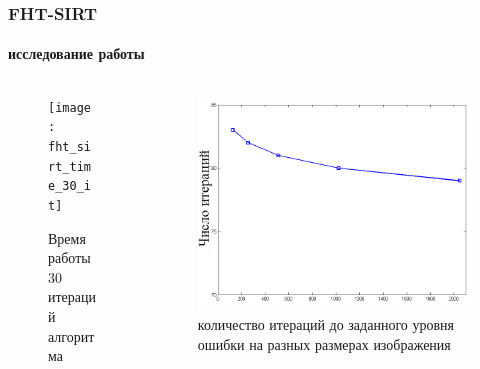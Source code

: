 \begin{frame}
\frametitle{FHT-SIRT}
\framesubtitle{исследование работы}

\begin{columns}[T,onlytextwidth]
  \hspace*{-0.5cm}
  \begin{column}{0.53\textwidth}
    \begin{figure}
      \centering
      \texttt{[image: fht\_sirt\_time\_30\_it]}
      \caption{Время работы 30 итераций алгоритма}
    \end{figure}
  \end{column}
  \begin{column}{0.6\textwidth}
    \begin{figure}
      \centering
      \includegraphics[width=\textwidth]{../Dissertation/images/part1_img/it_till_stop}
      \caption{количество итераций до заданного уровня ошибки на разных размерах изображения}
    \end{figure}
  \end{column}
\end{columns}
\end{frame}

